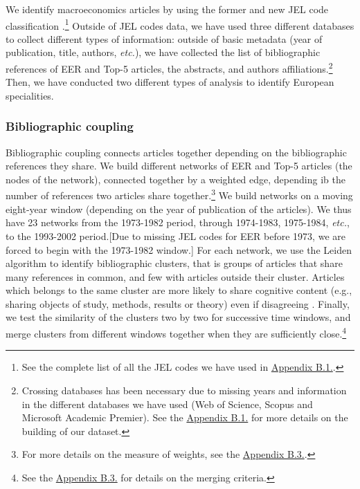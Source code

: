 \documentclass[]{elsarticle} %
\begin{document}
We identify macroeconomics articles by using the former and new JEL code
classification \citep{jel1991}.\footnote{See the complete list of all
  the JEL codes we have used in
  \protect\hyperlink{eer-top5-macro}{Appendix B.1.}.} Outside of JEL
codes data, we have used three different databases to collect different
types of information: outside of basic metadata (year of publication,
title, authors, \emph{etc.}), we have collected the list of
bibliographic references of EER and Top-5 articles, the abstracts, and
authors affiliations.\footnote{Crossing databases has been necessary due
  to missing years and information in the different databases we have
  used (Web of Science, Scopus and Microsoft Academic Premier). See the
  \protect\hyperlink{corpus}{Appendix B.1.} for more details on the
  building of our dataset.} Then, we have conducted two different types
of analysis to identify European specialities.

\hypertarget{bibliographic-coupling}{%
\subsubsection{Bibliographic coupling}\label{bibliographic-coupling}}

Bibliographic coupling connects articles together depending on the
bibliographic references they share. We build different networks of EER
and Top-5 articles (the nodes of the network), connected together by a
weighted edge, depending ib the number of references two articles share
together.\footnote{For more details on the measure of weights, see the
  \protect\hyperlink{network}{Appendix B.3.}.} We build networks on a
moving eight-year window (depending on the year of publication of the
articles). We thus have 23 networks from the 1973-1982 period, through
1974-1983, 1975-1984, \emph{etc.}, to the 1993-2002 period.{[}Due to
missing JEL codes for EER before 1973, we are forced to begin with the
1973-1982 window.{]} For each network, we use the Leiden algorithm
\citep{traag2019} to identify bibliographic clusters, that is groups of
articles that share many references in common, and few with articles
outside their cluster. Articles which belongs to the same cluster are
more likely to share cognitive content (e.g., sharing objects of study,
methods, results or theory) even if disagreeing
\citep{claveau2016, truc2021, goutsmedt2021}. Finally, we test the
similarity of the clusters two by two for successive time windows, and
merge clusters from different windows together when they are
sufficiently close.\footnote{See the
  \protect\hyperlink{network}{Appendix B.3.} for details on the merging
  criteria.}
\end{document}
